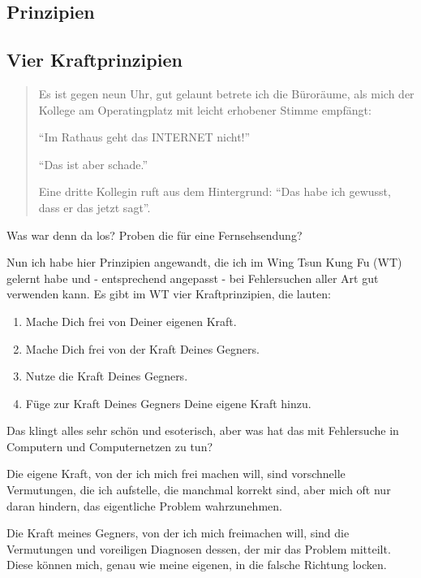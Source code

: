 \begin{normaltext}

\section{Prinzipien}
\label{sec:prinzipien}

\subsection*{Vier Kraftprinzipien}

\begin{quote}
Es ist gegen neun Uhr, gut gelaunt betrete ich die Büroräume, als mich der
Kollege am Operatingplatz mit leicht erhobener Stimme empfängt:

``Im Rathaus geht das INTERNET nicht!''

``Das ist aber schade.''

Eine dritte Kollegin ruft aus dem Hintergrund: ``Das habe ich gewusst, dass er
das jetzt sagt''.
\end{quote}

Was war denn da los? Proben die für eine Fernsehsendung?

Nun ich habe hier Prinzipien angewandt, die ich im Wing Tsun Kung Fu (WT)
gelernt habe und - entsprechend angepasst - bei Fehlersuchen aller Art gut
verwenden kann. Es gibt im WT vier Kraftprinzipien, die lauten:

\begin{enumerate}
  \item Mache Dich frei von Deiner eigenen Kraft.
  \item Mache Dich frei von der Kraft Deines Gegners.
  \item Nutze die Kraft Deines Gegners.
  \item Füge zur Kraft Deines Gegners Deine eigene Kraft hinzu.
\end{enumerate}

Das klingt alles sehr schön und esoterisch, aber was hat das mit Fehlersuche
in Computern und Computernetzen zu tun?

Die eigene Kraft, von der ich mich frei machen will, sind vorschnelle
Vermutungen, die ich aufstelle, die manchmal korrekt sind, aber mich oft nur
daran hindern, das eigentliche Problem wahrzunehmen.

Die Kraft meines Gegners, von der ich mich freimachen will, sind die
Vermutungen und voreiligen Diagnosen dessen, der mir das Problem mitteilt.
Diese können mich, genau wie meine eigenen, in die falsche Richtung locken.


\end{normaltext}
